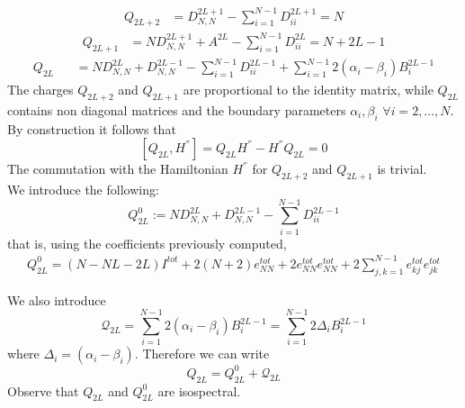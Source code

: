 \documentclass[10pt]{article}
\numberwithin{equation}{section}
\numberwithin{equation}{subsection}
\begin{document}
\begin{align}
Q_{2L+2}&=D_{N,N}^{2L+1}-\sum_{i=1}^{N-1}D_{ii}^{2L+1}=N
\end{align}
\begin{align}
Q_{2L+1}&=ND_{N,N}^{2L+1}+A^{2L}-\sum_{i=1}^{N-1}D_{ii}^{2L}=N+2L-1
\end{align}
\begin{align}
Q_{2L\phantom{+}}&=ND_{N,N}^{2L}+D_{N,N}^{2L-1}-\sum_{i=1}^{N-1}D_{ii}^{2L-1}+\sum_{i=1}^{N-1}2(\alpha_{i}-\beta_{i})B_{i}^{2L-1}
\end{align}
The charges $Q_{2L+2}$ and $Q_{2L+1}$ are proportional to the identity matrix, while $Q_{2L}$ contains non diagonal matrices and the boundary parameters $\alpha_{i},\beta_{i}$ $\forall i=2,\ldots,N$.\\
By construction it follows that 
\begin{equation}
\left[Q_{2L},H^{''}\right]=Q_{2L}H^{''}-H^{''}Q_{2L}=0
\end{equation}
The commutation with the Hamiltonian $H^{''}$ for $Q_{2L+2}$ and $Q_{2L+1}$ is trivial. \\
We introduce the following:
\begin{equation}
Q_{2L}^{0}:=ND_{N,N}^{2L}+D_{N,N}^{2L-1}-\sum_{i=1}^{N-1}D_{ii}^{2L-1}
\end{equation}
that is, using the coefficients previously computed, 
\begin{equation}\label{Q0Exp}
\begin{split}
Q_{2L}^{0}=(N-NL-2L)I^{tot}+2(N+2)e_{NN}^{tot}+2e_{NN}^{tot}e_{NN}^{tot}+2\sum_{j,k=1}^{N-1}e_{kj}^{tot}e_{jk}^{tot}
\end{split}
\end{equation}

We also introduce 
\begin{equation}\label{Q-nonDiag}
\mathcal{Q}_{2L}=\sum_{i=1}^{N-1}2(\alpha_{i}-\beta_{i})B_{i}^{2L-1}=\sum_{i=1}^{N-1}2\Delta_{i}B_{i}^{2L-1}
\end{equation}
where $\Delta_{i}=(\alpha_{i}-\beta_{i})$. 
Therefore we can write 
\begin{equation}
Q_{2L}=Q_{2L}^{0}+\mathcal{Q}_{2L}
\end{equation}
Observe that $Q_{2L}$ and $Q_{2L}^{0}$ are isospectral. \\
\end{document}
